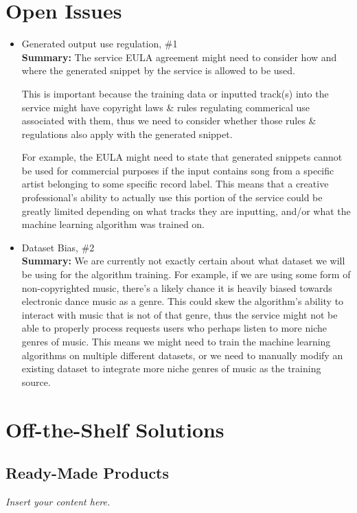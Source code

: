\documentclass[12pt]{article}
\newcommand{\lips}{\textit{Insert your content here.}}
\begin{document}
\section{Open Issues}
\begin{itemize}
  \item Generated output use regulation, \#1
  \\\textbf{Summary:} The service EULA agreement might need to consider how and where the generated snippet by the service is allowed
  to be used. 
  
  This is important because the training data or inputted track(s) into the service
  might have copyright laws \& rules regulating commerical use associated with them, thus we need to consider whether those rules \& regulations
   also apply with the generated snippet.  
  
  For example, the EULA might need to state that generated snippets cannot be used for commercial purposes if the input contains song from a 
  specific artist belonging to some specific record label. This means that a creative professional's ability to actually use 
  this portion of the service could be greatly limited depending on what tracks they
  are inputting, and/or what the machine learning algorithm was trained on. 

  \item Dataset Bias, \#2
  \\\textbf{Summary:} We are currently not exactly certain about what dataset we will be using for the algorithm training. 
  For example, if we are using some form of non-copyrighted music, there's a likely chance it is heavily biased towards electronic dance 
  music as a genre. This could skew the algorithm's ability to interact with music that is not of that genre, thus the service 
  might not be able to properly process requests users who perhaps listen to more niche genres of music. This means we might need to train the 
  machine learning algorithms on multiple different datasets, or we need to manually modify an existing dataset to integrate more niche genres 
  of music as the training source. 

\end{itemize}

\section{Off-the-Shelf Solutions}
\subsection{Ready-Made Products}
\lips
\end{document}
